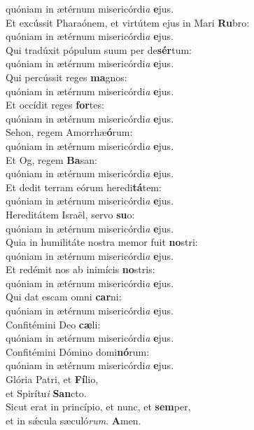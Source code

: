 \evenverse quóniam in ætérnum misericórdi\textit{a} \textbf{e}jus.\\
\oddverse Et excússit Pharaónem, et virtútem ejus in Mari \textbf{Ru}bro:~\*\\
\oddverse quóniam in ætérnum misericórdi\textit{a} \textbf{e}jus.\\
\evenverse Qui tradúxit pópulum suum per de\textbf{sér}tum:~\*\\
\evenverse quóniam in ætérnum misericórdi\textit{a} \textbf{e}jus.\\
\oddverse Qui percússit reges \textbf{ma}gnos:~\*\\
\oddverse quóniam in ætérnum misericórdi\textit{a} \textbf{e}jus.\\
\evenverse Et occídit reges \textbf{for}tes:~\*\\
\evenverse quóniam in ætérnum misericórdi\textit{a} \textbf{e}jus.\\
\oddverse Sehon, regem Amorrhæ\textbf{ó}rum:~\*\\
\oddverse quóniam in ætérnum misericórdi\textit{a} \textbf{e}jus.\\
\evenverse Et Og, regem \textbf{Ba}san:~\*\\
\evenverse quóniam in ætérnum misericórdi\textit{a} \textbf{e}jus.\\
\oddverse Et dedit terram eórum heredi\textbf{tá}tem:~\*\\
\oddverse quóniam in ætérnum misericórdi\textit{a} \textbf{e}jus.\\
\evenverse Hereditátem Israël, servo \textbf{su}o:~\*\\
\evenverse quóniam in ætérnum misericórdi\textit{a} \textbf{e}jus.\\
\oddverse Quia in humilitáte nostra memor fuit \textbf{no}stri:~\*\\
\oddverse quóniam in ætérnum misericórdi\textit{a} \textbf{e}jus.\\
\evenverse Et redémit nos ab inimícis \textbf{no}stris:~\*\\
\evenverse quóniam in ætérnum misericórdi\textit{a} \textbf{e}jus.\\
\oddverse Qui dat escam omni \textbf{car}ni:~\*\\
\oddverse quóniam in ætérnum misericórdi\textit{a} \textbf{e}jus.\\
\evenverse Confitémini Deo \textbf{cæ}li:~\*\\
\evenverse quóniam in ætérnum misericórdi\textit{a} \textbf{e}jus.\\
\oddverse Confitémini Dómino domi\textbf{nó}rum:~\*\\
\oddverse quóniam in ætérnum misericórdi\textit{a} \textbf{e}jus.\\
\evenverse Glória Patri, et \textbf{Fí}lio,~\*\\
\evenverse et Spirítu\textit{i} \textbf{San}cto.\\
\oddverse Sicut erat in princípio, et nunc, et \textbf{sem}per,~\*\\
\oddverse et in sǽcula sæculó\textit{rum}. \textbf{A}men.\\
